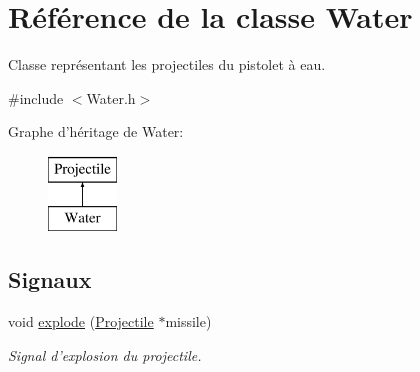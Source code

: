 \hypertarget{classWater}{
\section{Référence de la classe Water}
\label{classWater}
}


Classe représentant les projectiles du pistolet à eau.  




{\ttfamily \#include $<$Water.h$>$}

Graphe d'héritage de Water:\begin{figure}[H]
\begin{center}
\leavevmode
\includegraphics[height=2.000000cm]{classWater}
\end{center}
\end{figure}
\subsection*{Signaux}
\begin{DoxyCompactItemize}
\item 
void \hyperlink{classProjectile_a18d1fccd74f92b54f239c13c74cbc00c}{explode} (\hyperlink{classProjectile}{Projectile} $\ast$missile)
\begin{DoxyCompactList}\small\item\em Signal d'explosion du projectile. \end{DoxyCompactList}\end{DoxyCompactItemize}
